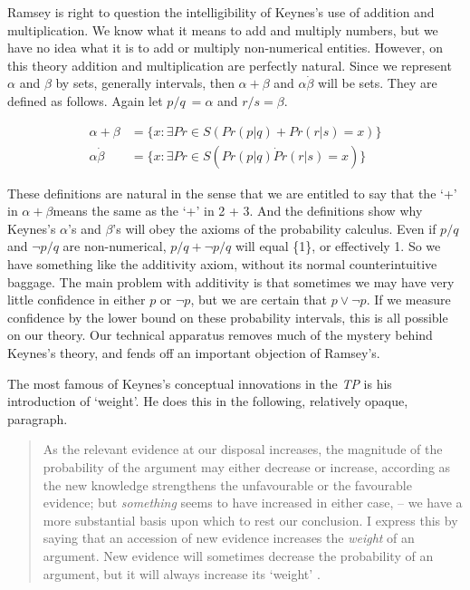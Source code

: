 Ramsey is right to question the intelligibility of Keynes's use of addition and multiplication. We know what it means to add and multiply numbers, but we have no idea what it is to add or multiply non-numerical entities. However, on this theory addition and multiplication are perfectly natural. Since we represent \(\alpha\) and \(\beta\) by sets, generally intervals, then \(\alpha + \beta\) and \(\alpha \dot \beta\) will be sets. They are defined as follows. Again let \(p / q\ = \alpha\) and \(r / s = \beta\).

\begin{align}
\alpha + \beta &= \{x: \exists Pr \in S (Pr(p | q) + Pr(r | s) = x)\} \\
\alpha \dot \beta &= \{x: \exists Pr \in S (Pr(p | q) \dot Pr(r | s) = x)\} 
\end{align}

These definitions are natural in the sense that we are entitled to say that the `+' in \(\alpha + \beta\)means the same as the `+' in 2 + 3. And the definitions show why Keynes's \(\alpha\)'s and \(\beta\)'s will obey the axioms of the probability calculus. Even if \(p / q\) and \(\neg p / q\) are non-numerical,  \(p / q + \neg p / q\) will equal \{1\}, or effectively 1. So we have something like the additivity axiom, without its normal counterintuitive baggage. The main problem with additivity is that sometimes we may have very little confidence in either \(p\) or \(\neg p\), but we are certain that \(p \vee \neg p\). If we measure confidence by the lower bound on these probability intervals, this is all possible on our theory. Our technical apparatus removes much of the mystery behind Keynes's theory, and fends off an important objection of Ramsey's. 

The most famous of Keynes's conceptual innovations in the \textit{TP} is his introduction of `weight'. He does this in the following, relatively opaque, paragraph.

\begin{quote}
As the relevant evidence at our disposal increases, the magnitude of the probability of the argument may either decrease or increase, according as the new knowledge strengthens the unfavourable or the favourable evidence; but \textit{something} seems to have increased in either case, -- we have a more substantial basis upon which to rest our conclusion. I express this by saying that an accession of new evidence increases the \textit{weight} of an argument. New evidence will sometimes decrease the probability of an argument, but it will always increase its `weight' \cite[77, italics in original]{Keynes1921}.
\end{quote}

